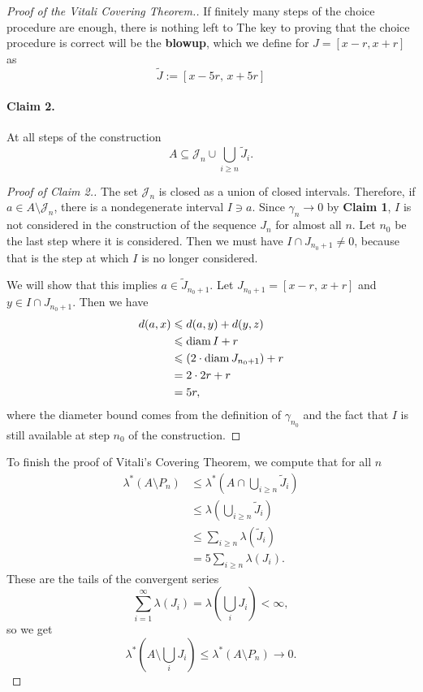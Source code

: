 \begin{proof}[Proof of the Vitali Covering Theorem.]
   If finitely many steps of the choice procedure are enough, there is nothing left to The key to proving that the choice procedure is correct will be the \textbf{blowup}, which we define for \( J = [x-r,x+r] \) as
   \[ 
       \widetilde{J} :=  [x - 5r,\, x + 5r]
  \]
   \paragraph{Claim 2.} At all steps of the construction
   \[ 
       A \subseteq \mathcal{J}_n \cup \bigcup_{i \geqslant n} \widetilde{J}_i.
  \]
  \begin{proof}[Proof of Claim 2.]
      The set \( \mathcal{J}_n \) is closed as a union of closed intervals. Therefore, if \( a \in A  \setminus \mathcal{J}_n \), there is a nondegenerate interval \( I \ni a \). Since \( \gamma_n \to 0 \) by \textbf{Claim 1}, \( I \) is not considered in the construction of the sequence \( J_n \) for almost all \( n \). Let \( n_0 \) be the last step where it is considered. Then we must have \( I \cap J_{n_0 + 1} \neq 0\), because that is the step at which \( I \) is no longer considered.

      We will show that this implies \( a \in \widetilde{J}_{n_0 + 1} \). Let \( J_{n_0 + 1} = [x - r,\, x + r] \) and \( y \in I \cap J_{n_0 + 1} \). Then we have
      \begin{align*}
          d(a, x) &\leqslant d(a,y) + d(y,z) \\
                  &\leqslant \operatorname{diam} I + r \\
                  &\leqslant \left(  2\cdot \operatorname{diam} J_{n_0 + 1} \right)+ r \\
                  &= 2 \cdot 2r + r \\
                  &= 5r,
      \end{align*}
      where the diameter bound comes from the definition of \( \gamma_{n_0} \) and the fact that \( I \) is still available at step \( n_0 \) of the construction.
  \end{proof}
  
  To finish the proof of Vitali's Covering Theorem, we compute that for all \( n \)
  \begin{align*}
      \lambda^* \left( A \setminus P_n \right) &\leqslant\lambda^* \left( A \cap \bigcup_{i \geqslant n} \widetilde{J}_i \right) \\
                                               &\leqslant \lambda \left( \bigcup_{i \geqslant n} \widetilde{J}_i \right) \\
                                               &\leqslant \sum_{i \geqslant n}\lambda(\widetilde{J}_i) \\
                                               &= 5\sum_{i \geqslant n}\lambda(J_i).
  \end{align*}
  These are the tails of the convergent series
  \[ 
      \sum_{i=1}^{\infty}\lambda(J_i) =\lambda \left( \bigcup_i J_i \right) < \infty,
 \]
 so we get
 \[ 
  \lambda^* \left( A \setminus \bigcup_i J_i \right) \leqslant \lambda^* \left( A \setminus P_n \right) \to 0.
\]
\end{proof}

